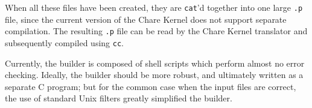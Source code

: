 When all these files have been created, they are {\tt cat}'d together
into one large {\tt .p} file, since the current version of the Chare
Kernel does not support separate compilation.  The resulting {\tt .p}
file can be read by the Chare Kernel translator and subsequently
compiled using {\tt cc}.

Currently, the builder is composed of shell scripts which perform almost
no error checking.  Ideally, the builder should be more robust, and
ultimately written as a separate C program; but for the common case when
the input files are correct, the use of standard Unix filters greatly
simplified the builder.